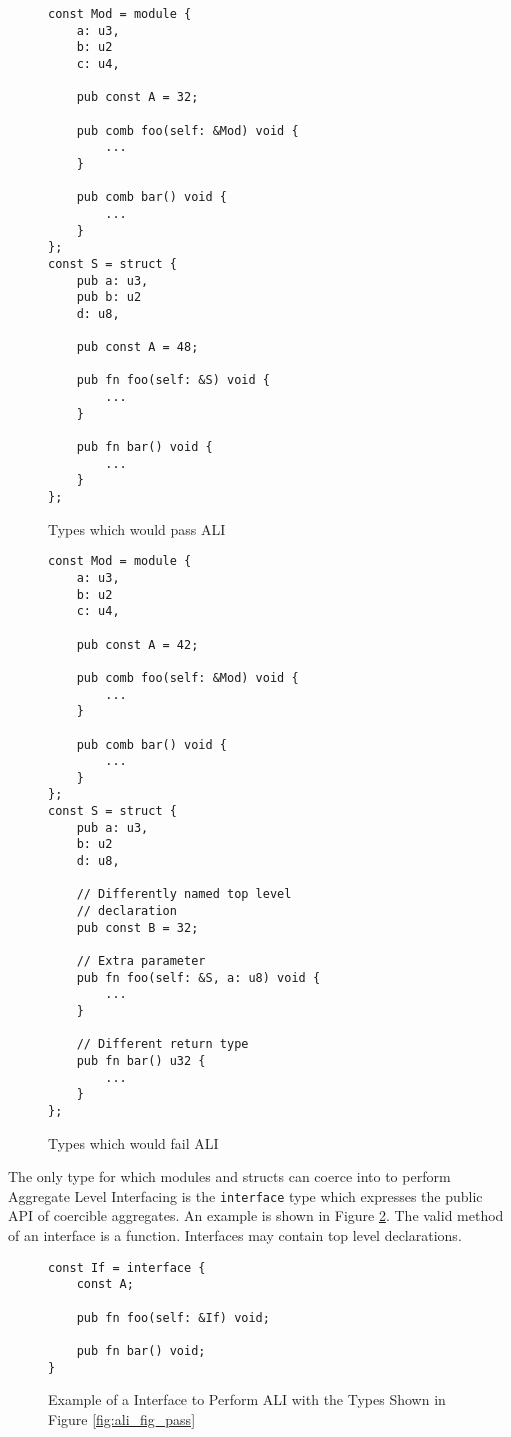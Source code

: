 \documentclass[10pt]{article}
\begin{document}
\begin{figure}[H]
	\begin{multicols}{2}
		\begin{verbatim}
const Mod = module {
    a: u3,
    b: u2
    c: u4,

    pub const A = 32;

    pub comb foo(self: &Mod) void {
        ...
    }

    pub comb bar() void {
        ...
    }
};
const S = struct {
    pub a: u3,
    pub b: u2
    d: u8,

    pub const A = 48;

    pub fn foo(self: &S) void {
        ...
    }

    pub fn bar() void {
        ...
    }
};
        \end{verbatim}
		\vspace*{-5mm}
		\caption{Types which would pass ALI}
		\label{fig:ali_fig_pass}
		\columnbreak
		\begin{verbatim}
const Mod = module {
    a: u3,
    b: u2
    c: u4,

    pub const A = 42;

    pub comb foo(self: &Mod) void {
        ...
    }

    pub comb bar() void {
        ...
    }
};
const S = struct {
    pub a: u3,
    b: u2
    d: u8,

    // Differently named top level
    // declaration
    pub const B = 32;

    // Extra parameter
    pub fn foo(self: &S, a: u8) void {
        ...
    }

    // Different return type
    pub fn bar() u32 {
        ...
    }
};
    \end{verbatim}
		\vspace*{-5mm}
		\caption{Types which would fail ALI}
		\label{fig:ali_fig_fail}
	\end{multicols}
\end{figure}

The only type for which modules and structs can coerce into to perform Aggregate Level Interfacing
is the \verb|interface| type which expresses the public API of coercible aggregates. An example is
shown in Figure \ref{fig:ali_interface}. The valid method of an interface is a function. Interfaces
may contain top level declarations.

\begin{figure}[H]
	\begin{verbatim}
const If = interface {
    const A;

    pub fn foo(self: &If) void;

    pub fn bar() void;
}
    \end{verbatim}
	\vspace*{-5mm}
	\caption{Example of a Interface to Perform ALI with the Types Shown in Figure \ref{fig:ali_fig_pass}}
	\label{fig:ali_interface}
\end{figure}
\end{document}
